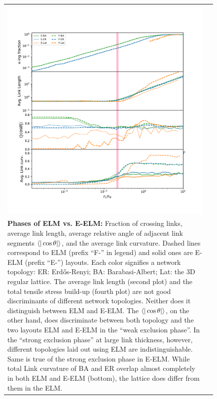 \documentclass[nofootinbib,preprint,floatfix,endfloats]{revtex4} %
\begin{document}
\begin{figure}
\begin{tabular}{ll}
\begin{minipage}{.7\columnwidth}
    \end{minipage}\\
    \begin{minipage}{.7\columnwidth}
    \includegraphics[width=\columnwidth,trim = 1cm 1cm 1cm 2.5cm, clip]{fig-09-19/phase-cur-succ.pdf}
    \end{minipage}
    &
    \begin{minipage}{.3\textwidth}
         \raggedright
         
    \begin{spacing}{.5}
    {\scriptsize
    ~\\
    \bigskip
         {\bf Phases of ELM vs. E-ELM:} 
         Fraction of crossing links, average link length, average relative angle of adjacent link segments $\be{|\cos\theta |}$, and the average link curvature. Dashed lines correspond to ELM (prefix ``F-'' in legend) and solid ones are E-ELM (prefix ``E-'') layouts. Each color signifies a network topology: ER: Erdős-Renyi; BA: Barabasi-Albert; Lat: the 3D regular lattice.  The average link length (second plot) and the total tensile stress build-up (fourth plot) are not good discriminants of different network topologies. Neither does it distinguish between ELM and E-ELM. The $\be{|\cos\theta |}$, on the other hand, does discriminate between both topology and the two layouts ELM and E-ELM in the  ``weak exclusion phase''. In the ``strong exclusion phase'' at large link thickness, however, different topologies laid out using ELM are indistinguishable. Same is true of the strong exclusion phase in E-ELM. While total Link curvature of BA and ER overlap almost completely in both ELM and E-ELM (bottom), the lattice does differ from them in the ELM.  
    }
    \end{spacing}
    \end{minipage}
         
    \end{tabular}
    \label{fig:phase-compare}
\end{figure}
\end{document}
